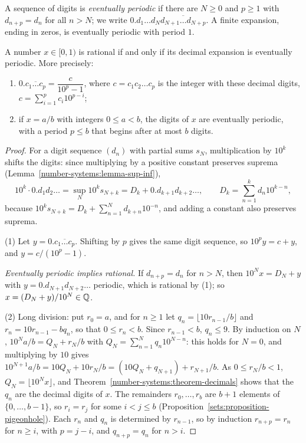 A sequence of digits is \emph{eventually periodic} if there are $N \geq 0$ and $p \geq 1$ with $d_{n+p} = d_n$ for all $n > N$; we write $0.d_1 \ldots d_N\overline{d_{N+1} \ldots d_{N+p}}$. A finite expansion,
ending in zeros, is eventually periodic with period $1$.

\begin{theorem}\label{number-systems:theorem-periodic-decimals}
A number $x \in [0, 1)$ is rational if and only if its decimal expansion is eventually periodic. More precisely:
\begin{enumerate}
\item $0.\overline{c_1 \ldots c_p} = \dfrac{c}{10^p - 1}$, where $c = c_1c_2\ldots c_p$ is the integer with these decimal digits, $c = \sum_{i=1}^pc_i10^{p-i}$;
\item if $x = a/b$ with integers $0 \leq a < b$, the digits of $x$ are eventually periodic, with a period $p \leq b$ that begins after at most $b$ digits.
\end{enumerate}
\end{theorem}

\begin{proof}
For a digit sequence $(d_n)$ with partial sums $s_N$, multiplication by $10^k$ shifts the digits: since multiplying by a positive constant preserves suprema (Lemma~\ref{number-systems:lemma-sup-inf}),
\[
10^k \cdot 0.d_1d_2\ldots = \sup_N10^ks_{N+k} = D_k + 0.d_{k+1}d_{k+2}\ldots, \qquad D_k = \sum_{n=1}^kd_n10^{k-n},
\]
because $10^ks_{N+k} = D_k + \sum_{n=1}^Nd_{k+n}10^{-n}$, and adding a constant also preserves suprema.

(1) Let $y = 0.\overline{c_1 \ldots c_p}$. Shifting by $p$ gives the same digit sequence, so $10^py = c + y$, and $y = c/(10^p - 1)$.

\emph{Eventually periodic implies rational.} If $d_{n+p} = d_n$ for $n > N$, then $10^Nx = D_N + y$ with $y = 0.d_{N+1}d_{N+2}\ldots$ periodic, which is rational by (1); so $x = (D_N + y)/10^N \in \mathbb{Q}$.

(2) Long division: put $r_0 = a$, and for $n \geq 1$ let $q_n = \lfloor 10r_{n-1}/b\rfloor$ and $r_n = 10r_{n-1} - bq_n$, so that $0 \leq r_n < b$. Since $r_{n-1} < b$, $q_n \leq 9$. By induction on $N$,
$10^Na/b = Q_N + r_N/b$ with $Q_N = \sum_{n=1}^Nq_n10^{N-n}$: this holds for $N = 0$, and multiplying by $10$ gives $10^{N+1}a/b = 10Q_N + 10r_N/b = (10Q_N + q_{N+1}) + r_{N+1}/b$. As $0 \leq r_N/b < 1$,
$Q_N = \lfloor 10^Nx\rfloor$, and Theorem~\ref{number-systems:theorem-decimals} shows that the $q_n$ are the decimal digits of $x$. The remainders $r_0, \ldots, r_b$ are $b + 1$ elements of $\{0, \ldots, b - 1\}$, so
$r_i = r_j$ for some $i < j \leq b$ (Proposition~\ref{sets:proposition-pigeonhole}). Each $r_n$ and $q_n$ is determined by $r_{n-1}$, so by induction $r_{n+p} = r_n$ for $n \geq i$, with $p = j - i$, and
$q_{n+p} = q_n$ for $n > i$.
\end{proof}

